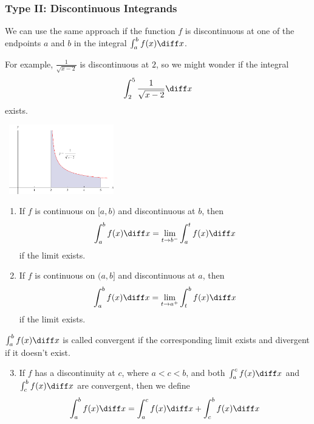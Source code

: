 \begin{frame}
\frametitle{Type II: Discontinuous Integrands}
We can use the same approach if the function $f$ is discontinuous at one of the endpoints $a$ and $b$ in the integral $\int_a^b f(x) \diff x$.

For example, $\frac{1}{\sqrt{x - 2}}$ is discontinuous at $2$, so we might wonder if the integral
\[
\int_2^5 \frac{1}{\sqrt{x-2}}\diff x
\]
exists.

\begin{center}
\ \includegraphics[height=3cm]{improper-integrals/pictures/08-08-ex5.pdf}%
\end{center}
\end{frame}

\begin{frame}
\begin{definition}
\begin{enumerate}
\item  If $f$ is continuous on $[a, b)$ and discontinuous at $b$, then
\abovedisplayskip=0pt
\belowdisplayskip=0pt
\[
\int_a^b f(x) \diff x = \lim_{t\rightarrow b^-} \int_a^t f(x) \diff x
\]
if the limit exists.
\item  If $f$ is continuous on $(a, b]$ and discontinuous at $a$, then
\abovedisplayskip=0pt
\belowdisplayskip=0pt
\[
\int_a^b f(x) \diff x = \lim_{t\rightarrow a^+} \int_t^b f(x) \diff x
\]
if the limit exists.
\end{enumerate}
$\int_a^bf(x) \diff x$ is called convergent if the corresponding limit exists and divergent if it doesn't exist.
\begin{enumerate}
\setcounter{enumi}{2}
\item  If $f$ has a discontinuity at $c$, where $a < c < b$, and both $\int_a^c f(x)\diff x$ and $\int_c^b f(x)\diff x$ are convergent, then we define 
\abovedisplayskip=0pt
\belowdisplayskip=0pt
\[
\int_a^b f(x) \diff x = \int_a^c f(x)\diff x + \int_c^b f(x) \diff x
\]
\end{enumerate}
\end{definition}
\end{frame}
